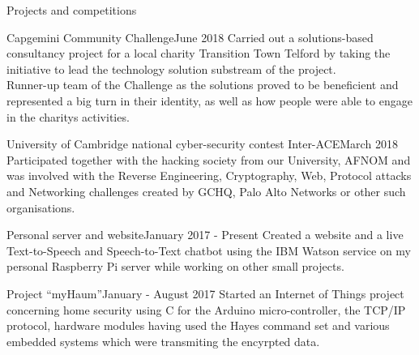 \documentclass{resume} %
\newcommand{\quotes}[1]{``#1''}
\begin{document}
\newpage

\begin{rSection}{Projects and competitions}

\begin{rSubsection}{Capgemini Community Challenge}{June 2018}{}{}
Carried out a solutions-based consultancy project for a local charity Transition Town Telford by taking the initiative to lead the technology solution substream of the project.
\\Runner-up team of the Challenge as the solutions proved to be beneficient and represented a big turn in their identity, as well as how people were able to engage in the charity\textsc{}s activities.
\end{rSubsection}

\begin{rSubsection}{University of Cambridge national cyber-security contest Inter-ACE}{March 2018}{}{}
Participated together with the hacking society from our University, AFNOM and was involved with the Reverse Engineering, Cryptography, Web, Protocol attacks and Networking challenges created by GCHQ, Palo Alto Networks or other such organisations.
\end{rSubsection}

\begin{rSubsection}{Personal server and website}{January 2017 - Present}{}{}
Created a website and a live Text-to-Speech and Speech-to-Text chatbot using the IBM Watson service on my personal Raspberry Pi server while working on other small projects.
\end{rSubsection}

\begin{rSubsection}{Project \quotes{myHaum}}{January - August 2017}{}{}
Started an Internet of Things project concerning home security using C for the Arduino micro-controller, the TCP/IP protocol, hardware modules having used the Hayes command set and various embedded systems which were transmiting the encyrpted data.
\end{rSubsection}


\end{rSection}

\end{document}
